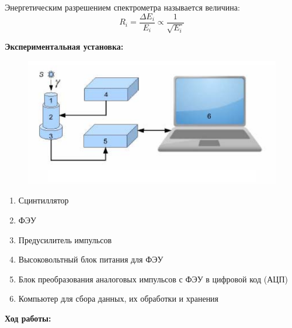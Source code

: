 \documentclass[a4paper, 12pt]{article}%
\begin{document}
	Энергетическим разрешением спектрометра называется величина:
\[R_i = \dfrac{\Delta E_i}{E_i} \propto \dfrac{1}{\sqrt{E_i}}\]

\textbf{Экспериментальная установка:}\\\par

\begin{figure}[h!]
	\centering
	\includegraphics[scale=0.4]{Установка.PNG}
\end{figure}

\begin{enumerate}

	\item Сцинтиллятор

	\item ФЭУ
	
	\item Предусилитель импульсов
	
	\item Высоковольтный блок питания для ФЭУ
	
	\item Блок преобразования аналоговых импульсов с ФЭУ в цифровой код (АЦП)
	
	\item Компьютер для сбора данных,  их обработки и хранения\\

\end{enumerate}

\textbf{Ход работы:}\\\par
\end{document}
